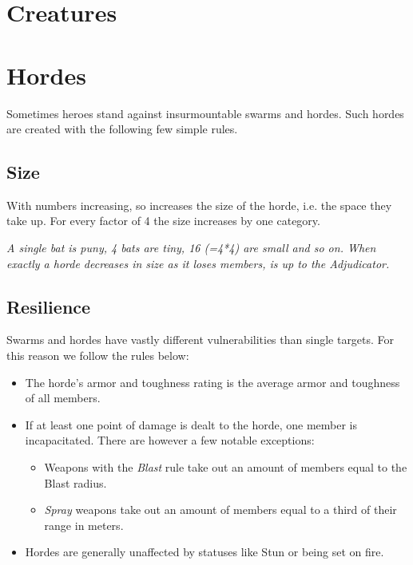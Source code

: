 \documentclass[12pt,a4paper,openany,usenames,dvipsnames]{book}
\begin{document}
	\vspace{5mm}
	

	\pagebreak

	\section{Creatures}
	\label{sec:creatures}
	

	\pagebreak
	\section{Hordes}
	Sometimes heroes stand against insurmountable swarms and hordes. Such hordes are created with the following few simple rules.
	
	\subsection*{Size}
	With numbers increasing, so increases the size of the horde, i.e. the space they take up. For every factor of 4 the size increases by one category.
	\begin{exampleblock}
		\itshape A single bat is puny, 4 bats are tiny, 16 (=4*4) are small and so on.
		When exactly a horde decreases in size as it loses members, is up to the Adjudicator.
	\end{exampleblock}
	
	\subsection*{Resilience}
	Swarms and hordes have vastly different vulnerabilities than single targets. For this reason we follow the rules below:
	\begin{itemize}
		\setlength\itemsep{-8mm} \vspace{-8mm}
		\item The horde's armor and toughness rating is the average armor and toughness of all members.
		\item If at least one point of damage is dealt to the horde, one member is incapacitated. There are however a few notable exceptions:
			\begin{itemize}
				\setlength\itemsep{-8mm} \vspace{-8mm}
				\item Weapons with the \emph{Blast} rule take out an amount of members equal to the Blast radius.
				\item \emph{Spray} weapons take out an amount of members equal to a third of their range in meters.
			\end{itemize}
		\item Hordes are generally unaffected by statuses like Stun or being set on fire.
	\end{itemize}
	
\end{document}
